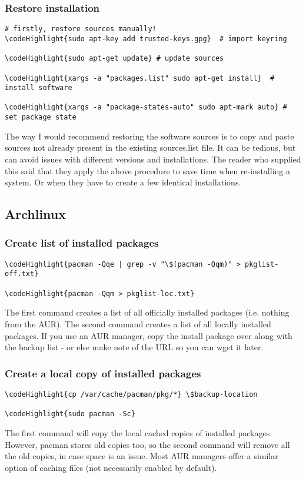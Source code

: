 \documentclass[12pt,a4paper]{article}
\begin{document}
\subsubsection{Restore installation}

\begin{Verbatim}[commandchars=\\\{\}]
# firstly, restore sources manually!
\codeHighlight{sudo apt-key add trusted-keys.gpg}  # import keyring

\codeHighlight{sudo apt-get update} # update sources

\codeHighlight{xargs -a "packages.list" sudo apt-get install}  # install software

\codeHighlight{xargs -a "package-states-auto" sudo apt-mark auto} # set package state
\end{Verbatim}
The way I would recommend restoring the software sources is to copy and paste sources not already present in the existing sources.list file.  It can be tedious, but can avoid issues with different versions and installations.  The reader who supplied this said that they apply the above procedure to save time when re-installing a system. Or when they have to create a few identical installations.

\subsection{Archlinux}

\subsubsection{Create list of installed packages}
\label{Arch-installed-packages}
\begin{Verbatim}[commandchars=\\\{\}]
\codeHighlight{pacman -Qqe | grep -v "\$(pacman -Qqm)" > pkglist-off.txt}

\codeHighlight{pacman -Qqm > pkglist-loc.txt}
\end{Verbatim}
The first command creates a list of all officially installed packages (i.e. nothing from the AUR).  The second command creates a list of all locally installed packages.  If you use an AUR manager, copy the install package over along with the backup list - or else make note of the URL so you can wget it later.

\subsubsection{Create a local copy of installed packages}
\begin{Verbatim}[commandchars=\\\{\}]
\codeHighlight{cp /var/cache/pacman/pkg/*} \$backup-location

\codeHighlight{sudo pacman -Sc}
\end{Verbatim}
The first command will copy the local cached copies of installed packages.  However, pacman stores old copies too, so the second command will remove all the old copies, in case space is an issue.  Most AUR managers offer a similar option of caching files (not necessarily enabled by default).
\end{document}
